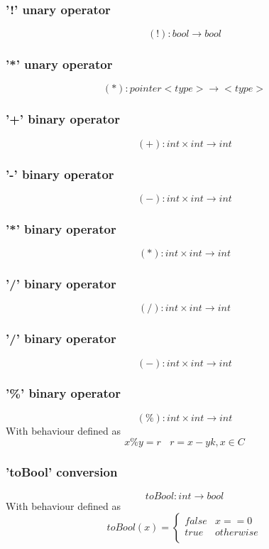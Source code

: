 \documentclass{article}
\begin{document}
\subsubsection{'!' unary operator}
$$
(!): bool \longrightarrow bool
$$

\subsubsection{'*' unary operator}
$$
(*): pointer <type> \longrightarrow <type> 
$$

\subsubsection{'+' binary operator}
$$
(+): int \times int \longrightarrow int
$$

\subsubsection{'-' binary operator}
$$
(-): int \times int \longrightarrow int
$$

\subsubsection{'*' binary operator}
$$
(*): int \times int \longrightarrow int
$$

\subsubsection{'/' binary operator}
$$
(/): int \times int \longrightarrow int
$$

\subsubsection{'/' binary operator}
$$
(-): int \times int \longrightarrow int
$$
\subsubsection{'\%' binary operator}
$$
(\%): int \times int \longrightarrow int
$$
With behaviour defined as
$$
x\%y = r \ \ \ \ r = x - yk, x \in C
$$

\subsubsection{'toBool' conversion}
$$
toBool: int \longrightarrow bool
$$
With behaviour defined as
$$
toBool(x) =  \left\{ \begin{array}{ll}
false & x == 0  \\
true & otherwise \\
\end{array} \right.
$$
\end{document}
